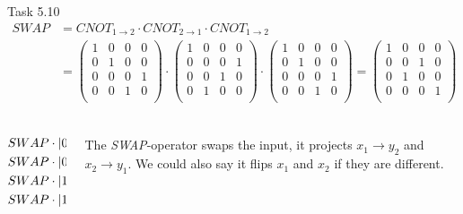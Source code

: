 \documentclass[aspectratio=169]{beamer}
\begin{document}
\begin{frame}{Task 5.10}
\begin{align*}
SWAP &= CNOT_{1\rightarrow2}\cdot CNOT_{2\rightarrow1}\cdot CNOT_{1\rightarrow2} \\
&= \begin{pmatrix}
1 & 0 & 0 & 0\\
0 & 1 & 0 & 0\\
0 & 0 & 0 & 1\\
0 & 0 & 1 & 0\\
\end{pmatrix}\cdot \begin{pmatrix}
1 & 0 & 0 & 0\\
0 & 0 & 0 & 1\\
0 & 0 & 1 & 0\\
0 & 1 & 0 & 0\\
\end{pmatrix}\cdot \begin{pmatrix}
1 & 0 & 0 & 0\\
0 & 1 & 0 & 0\\
0 & 0 & 0 & 1\\
0 & 0 & 1 & 0\\
\end{pmatrix} = \begin{pmatrix}
1 & 0 & 0 & 0\\
0 & 0 & 1 & 0\\
0 & 1 & 0 & 0\\
0 & 0 & 0 & 1\\
\end{pmatrix}\\
\end{align*}

\begin{columns}
\begin{column}{0.5\textwidth}
\begin{align*}
SWAP \cdot \ket{00} = \ket{00}\\
SWAP \cdot \ket{01} = \ket{10}\\
SWAP \cdot \ket{10} = \ket{01}\\
SWAP \cdot \ket{11} = \ket{11}\\
\end{align*}
\end{column}
\begin{column}{0.5\textwidth}
The \textit{SWAP}-operator swaps the input, it projects $x_1 \rightarrow y_2$ and $x_2 \rightarrow y_1$. We could also say it flips $x_1$ and $x_2$ if they are different.

\end{column}
\end{columns}

\end{frame}
\end{document}
